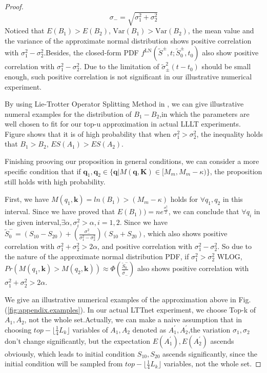 \documentclass[letterpaper]{article} %
\newcommand{\mb}{\mathbf}
\begin{document}
\begin{appendices}
\begin{proof}
\begin{equation*}
\end{equation*}
\begin{equation*}
    \sigma_-=\sqrt{\sigma_1^2+\sigma_2^2}
\end{equation*}
Noticed that $E(B_1)>E(B_2)$, $\mathrm{Var}(B_1)>\mathrm{Var}(B_2)$, the mean value and the variance of the approximate normal distribution shows positive correlation with $\sigma_1^2-\sigma_2^2$.Besides, the closed-form PDF $f^{\mathrm{LN}}\left(\tilde{S}^{\pm}, t ; \tilde{S}_{0}^{\pm}, t_{0}\right)$ also show positive correlation with $\sigma_1^2-\sigma_2^2$. Due to the limitation of $\tilde{\sigma}_{\pm}^{2}\left(t-t_{0}\right)$ should be small enough, such positive correlation is not significant in our illustrative numerical experiment.

By using Lie-Trotter Operator Splitting Method in \cite{lo2012sum}, we can give illustrative numeral examples for the distribution of $B_1-B_2$,in which the parameters are well chosen to fit for our top-u approximation in actual LLLT experiments. Figure shows that it is of high probability that when $\sigma_1^2>\sigma_2^2$, the inequality holds that $B_1>B_2$, $ES(A_1)>ES(A_2)$.

Finishing prooving our proposition in general conditions, we can consider a more specific condition that if $\mb{q}_1, \mb{q}_2 \in \{ \mb{q} | M(\mb{q}, \mb{K}) \in [ M_{m},  M_{m} - \kappa)\}$, the proposition still holds with high probability.

First, we have $M(q_1,\mb{k})=ln(B_1)>(M_m-\kappa)$ holds for $\forall q_1,q_2$ in this interval. Since we have proved that $E(B_1))=ne^{\frac{\sigma_1^2}{2}}$, we can conclude that $\forall q_i$ in the given interval,$\exists \alpha, \sigma_i^2>\alpha, i=1,2$. Since we have $\widetilde{S}_{0}^{-}=(S_{10}-S_{20})+\left(\frac{\sigma_{-}^{2}}{\sigma_{1}^{2}-\sigma_{2}^{2}}\right) (S_{10}+S_{20})$, which also shows positive correlation with $\sigma_1^2+\sigma_2^2>2\alpha$, and positive correlation with $\sigma_1^2-\sigma_2^2$. So due to the nature of the approximate normal distribution PDF, if $\sigma_1^2>\sigma_2^2$ WLOG, $Pr(M(q_1,\mb{k})>M(q_2,\mb{k}))\approx \Phi(\frac{\widetilde{S}_{0}^{-}}{\tilde{\sigma_-}})$ also shows positive correlation with $\sigma_1^2+\sigma_2^2>2\alpha$.

We give an illustrative numerical examples of the approximation above in Fig.(\ref{fig:appendix.examples}). In our actual LTTnet experiment, we choose Top-k of $A_1,A_2$, not the whole set.Actually, we can make a naive assumption that in choosing $top-\lfloor\frac{1}{4}L_k\rfloor$ variables of $A_1,A_2$ denoted as $A_1^{'} , A_2^{'}$,the variation $\sigma_1,\sigma_2$ don't change significantly, but the expectation $E(A_1^{'}) , E(A_2^{'})$ 
ascends obviously, which leads to initial condition $S_{10},S_{20}$ ascends significantly, since the initial condition will be sampled from $top-\lfloor\frac{1}{4}L_k\rfloor$ variables, not the whole set.


\end{proof}
\end{appendices}
\end{document}
